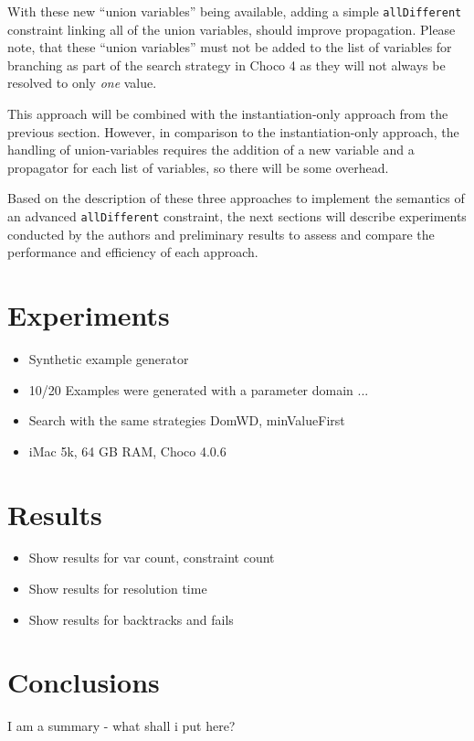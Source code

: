\documentclass[english,biblatex]{lni}
\begin{document}
With these new ``union variables'' being available, adding a simple \texttt{allDifferent} constraint linking all of the union variables, should improve propagation.
Please note, that these ``union variables'' must not be added to the list of variables for branching as part of the search strategy in Choco 4 as they will not always be resolved to only \emph{one} value.

This approach will be combined with the instantiation-only approach from the previous section.
However, in comparison to the instantiation-only approach, the handling of union-variables requires the addition of a new variable and a propagator for each list of variables, so there will be some overhead.

Based on the description of these three approaches to implement the semantics of an advanced \texttt{allDifferent} constraint, the next sections will describe experiments conducted by the authors and preliminary results to assess and compare the performance and efficiency of each approach.

\section{Experiments}

\begin{itemize}
\item Synthetic example generator 
\item 10/20 Examples were generated with a parameter domain ...
\item Search with the same strategies DomWD, minValueFirst
\item iMac 5k, 64 GB RAM, Choco 4.0.6
\end{itemize}

\section{Results}

\begin{itemize}
\item Show results for var count, constraint count
\item Show results for resolution time
\item Show results for backtracks and fails
\end{itemize}

\section{Conclusions}

I am a summary - what shall i put here?

\printbibliography[heading=bibintoc]
\end{document}
